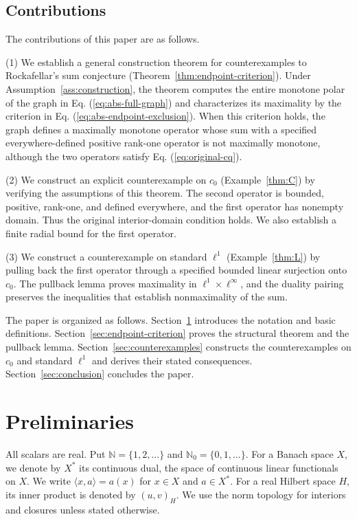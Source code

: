 \documentclass[11pt]{article}
\newcommand{\N}{\mathbb N}
\newcommand{\Nzero}{\mathbb N_0}
\newcommand{\pair}[2]{\langle #1,#2\rangle}
\theoremstyle{definition}
\theoremstyle{remark}
\begin{document}
\subsection{Contributions}
The contributions of this paper are as follows.

(1) We establish a general construction theorem for counterexamples to Rockafellar's sum conjecture (Theorem~\ref{thm:endpoint-criterion}). Under Assumption~\ref{ass:construction}, the theorem computes the entire monotone polar of the graph in Eq. (\ref{eq:abs-full-graph}) and characterizes its maximality by the criterion in Eq. (\ref{eq:abs-endpoint-exclusion}). When this criterion holds, the graph defines a maximally monotone operator whose sum with a specified everywhere-defined positive rank-one operator is not maximally monotone, although the two operators satisfy Eq. (\ref{eq:original-cq}).

(2) We construct an explicit counterexample on $c_0$ (Example~\ref{thm:C}) by verifying the assumptions of this theorem. The second operator is bounded, positive, rank-one, and defined everywhere, and the first operator has nonempty domain. Thus the original interior-domain condition holds. We also establish a finite radial bound for the first operator.

(3) We construct a counterexample on standard $\ell^1$ (Example~\ref{thm:L}) by pulling back the first operator through a specified bounded linear surjection onto $c_0$. The pullback lemma proves maximality in $\ell^1\times\ell^\infty$, and the duality pairing preserves the inequalities that establish nonmaximality of the sum.

The paper is organized as follows. Section~\ref{sec:definitions} introduces the notation and basic definitions. Section~\ref{sec:endpoint-criterion} proves the structural theorem and the pullback lemma. Section~\ref{sec:counterexamples} constructs the counterexamples on $c_0$ and standard $\ell^1$ and derives their stated consequences. Section~\ref{sec:conclusion} concludes the paper.


\section{Preliminaries}
\label{sec:definitions}
All scalars are real. Put $\N=\{1,2,\ldots\}$ and $\Nzero=\{0,1,\ldots\}$. For a Banach space $X$, we denote by $X^*$ its continuous dual, the space of continuous linear functionals on $X$. We write $\pair{x}{a}=a(x)$ for $x\in X$ and $a\in X^*$. For a real Hilbert space $H$, its inner product is denoted by $(u,v)_H$. We use the norm topology for interiors and closures unless stated otherwise.
\end{document}
